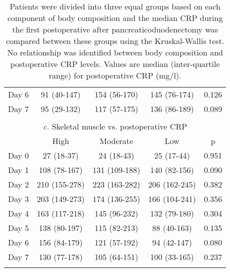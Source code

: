 \begin{table}[p]
\begin{tabular}{|l c c c c |}
		Day 6 & 91 (40-147)   & 154 (56-170)  & 145 (76-174)  & 0.126          \\
		Day 7 & 95 (29-132)   & 117 (57-175)  & 136 (86-189)  & 0.089          \\ \hline
		                         \multicolumn{5}{c}{}                          \\
		\multicolumn{5}{c}{\textit{c.} Skeletal muscle vs. postoperative CRP}  \\ \hline
		      & High          & Moderate      & Low           & p              \\
		Day 0 & 27 (18-37)    & 24 (18-43)    & 25 (17-44)    & 0.951          \\
		Day 1 & 108 (78-167)  & 131 (109-188) & 140 (82-156)  & 0.090          \\
		Day 2 & 210 (155-278) & 223 (163-282) & 206 (162-245) & 0.382          \\
		Day 3 & 203 (149-273) & 174 (136-255) & 166 (104-241) & 0.356          \\
		Day 4 & 163 (117-218) & 145 (96-232)  & 132 (79-180)  & 0.304          \\
		Day 5 & 138 (80-197)  & 115 (82-213)  & 88 (40-163)   & 0.135          \\
		Day 6 & 156 (84-179)  & 121 (57-192)  & 94 (42-147)   & 0.080          \\
		Day 7 & 130 (77-178)  & 105 (64-151)  & 100 (33-165)  & 0.237          \\ \hline
		                         \multicolumn{5}{c}{}
	\end{tabular}
	\caption*{Patients were divided into three equal groups based on each component of body composition and the median CRP during the first postoperative after pancreaticoduodenectomy was compared between these groups using the Kruskal-Wallis test. 
	No relationship was identified between body composition and postoperative CRP levels. 
	Values are median (inter-quartile range) for postoperative CRP (mg/l). }
\end{table}



